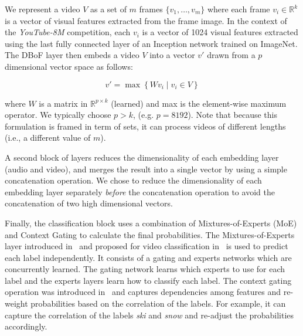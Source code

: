 \documentclass[runningheads]{llncs}
\newcommand{\yt}{\textit{YouTube-8M}\xspace}
\begin{document}
We represent a video $V$ as a set of $m$ frames $\{v_{1},\ldots,v_{m}\}$ where each frame $v_i \in \mathbb R^k$ is a vector of visual features extracted from the frame image.  In the context of the \yt competition, each $v_i$ is a vector of 1024 visual features extracted using the last fully connected layer of an Inception network trained on ImageNet.
The DBoF layer then embeds a video $V$ into a vector $v'$ drawn from a  $p$ dimensional vector space as follows:

\begin{equation*}
	v' = \max\left\{ Wv_{i}\mid v_i \in V \right\}
\end{equation*}

\noindent
where $W$ is a matrix in $\mathbb R^{p \times k}$ (learned) and max is the element-wise maximum operator. We typically choose $p > k$, (e.g. $p = 8192$).
Note that because this formulation is framed in term of sets, it can process videos of different lengths (i.e., a different value of $m$).

A second block of layers reduces the dimensionality of each embedding layer (audio and video), and merges the result into a single vector by using a simple concatenation operation. We chose to reduce the dimensionality of each embedding layer separately {\em before} the concatenation operation to avoid the concatenation of two high dimensional vectors.

Finally, the classification block uses a combination of Mixtures-of-Experts (MoE) and Context Gating to calculate the final probabilities. The Mixtures-of-Experts layer introduced in~\cite{716791} and proposed for video classification in~\cite{45619} is used to predict each label independently. It consists of a gating and experts networks which are concurrently learned. The gating network learns which experts to use for each label and the experts layers learn how to classify each label. The context gating operation was introduced in~\cite{DBLP:journals/corr/MiechLS17} and captures dependencies among features and re-weight probabilities based on the correlation of the labels. For example, it can capture the correlation of the labels {\em ski} and {\em snow} and re-adjust the probabilities accordingly. 
\end{document}
